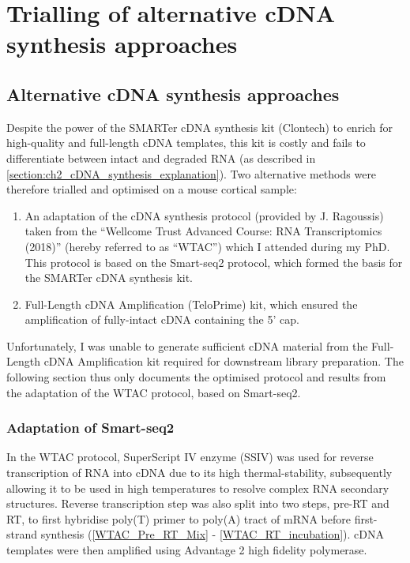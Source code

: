 \cleardoublepage
\chapter{Trialling of alternative cDNA synthesis approaches}\label{ch:alt_cDNA}

\stoptocwriting
\section{Alternative cDNA synthesis approaches}
Despite the power of the SMARTer cDNA synthesis kit (Clontech) to enrich for high-quality and full-length cDNA templates, this kit is costly and fails to differentiate between intact and degraded RNA (as described in \cref{section:ch2_cDNA_synthesis_explanation}). Two alternative methods were therefore trialled and optimised on a mouse cortical sample:
\begin{enumerate}
	\item An adaptation of the cDNA synthesis protocol (provided by J. Ragoussis) taken from the “Wellcome Trust Advanced Course: RNA Transcriptomics (2018)” (hereby referred to as “WTAC”) which I attended during my PhD. This protocol is based on the Smart-seq2 protocol\cite{Picelli2014}, which formed the basis for the SMARTer cDNA synthesis kit. 
	\item Full-Length cDNA Amplification (TeloPrime) kit, which ensured the amplification of fully-intact cDNA containing the 5' cap.    
\end{enumerate}

Unfortunately, I was unable to generate sufficient cDNA material from the Full-Length cDNA Amplification kit required for downstream library preparation. The following section thus only documents the optimised protocol and results from the adaptation of the WTAC protocol, based on Smart-seq2.

\subsection{Adaptation of Smart-seq2}
In the WTAC protocol, SuperScript IV enzyme (SSIV) was used for reverse transcription of RNA into cDNA due to its high thermal-stability, subsequently allowing it to be used in high temperatures to resolve complex RNA secondary structures. Reverse transcription step was also split into two steps, pre-RT and RT, to first hybridise poly(T) primer to poly(A) tract of mRNA before first-strand synthesis (\cref{WTAC_Pre_RT_Mix} - \cref{WTAC_RT_incubation}). cDNA templates were then amplified using Advantage 2 high fidelity polymerase.

